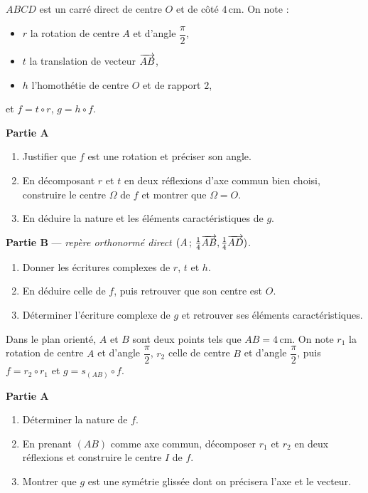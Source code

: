 $ABCD$ est un carré direct de centre $O$ et de côté $4\,$cm. On note :
\begin{itemize}[label=\textbullet]
	\item $r$ la rotation de centre $A$ et d'angle $\dfrac{\pi}{2}$,
	\item $t$ la translation de vecteur $\overrightarrow{AB}$,
	\item $h$ l'homothétie de centre $O$ et de rapport $2$,
\end{itemize}
et $f = t\circ r$, $g = h\circ f$.

\textbf{Partie A}
\begin{enumerate}
	\item Justifier que $f$ est une rotation et préciser son angle.
	\item En décomposant $r$ et $t$ en deux réflexions d'axe commun bien choisi,
	construire le centre $\Omega$ de $f$ et montrer que $\Omega = O$.
	\item En déduire la nature et les éléments caractéristiques de $g$.
\end{enumerate}

\textbf{Partie B} — \textit{repère orthonormé direct
$(A\,;\,\frac14\overrightarrow{AB},\frac14\overrightarrow{AD})$.}
\begin{enumerate}
	\item Donner les écritures complexes de $r$, $t$ et $h$.
	\item En déduire celle de $f$, puis retrouver que son centre est $O$.
	\item Déterminer l'écriture complexe de $g$ et retrouver ses éléments
	caractéristiques.
\end{enumerate}

Dans le plan orienté, $A$ et $B$ sont deux points tels que $AB = 4\,$cm. On
note $r_1$ la rotation de centre $A$ et d'angle $\dfrac{\pi}{2}$, $r_2$ celle
de centre $B$ et d'angle $\dfrac{\pi}{2}$, puis $f = r_2\circ r_1$ et
$g = s_{(AB)}\circ f$.

\textbf{Partie A}
\begin{enumerate}
	\item Déterminer la nature de $f$.
	\item En prenant $(AB)$ comme axe commun, décomposer $r_1$ et $r_2$ en deux
	réflexions et construire le centre $I$ de $f$.
	\item Montrer que $g$ est une symétrie glissée dont on précisera l'axe et le
	vecteur.
\end{enumerate}


